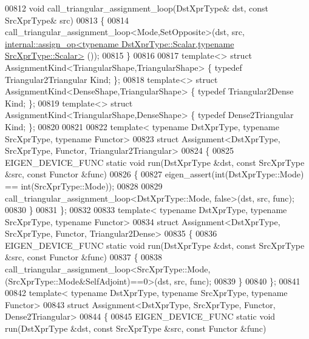 \begin{DoxyCode}
00812 \textcolor{keywordtype}{void} call\_triangular\_assignment\_loop(DstXprType& dst, \textcolor{keyword}{const} SrcXprType& src)
00813 \{
00814   call\_triangular\_assignment\_loop<Mode,SetOpposite>(dst, src, 
      \hyperlink{struct_eigen_1_1internal_1_1assign__op}{internal::assign\_op<typename DstXprType::Scalar,typename SrcXprType::Scalar>}
      ());
00815 \}
00816 
00817 \textcolor{keyword}{template}<> \textcolor{keyword}{struct }AssignmentKind<TriangularShape,TriangularShape> \{ \textcolor{keyword}{typedef} Triangular2Triangular Kind; \};
00818 \textcolor{keyword}{template}<> \textcolor{keyword}{struct }AssignmentKind<DenseShape,TriangularShape>      \{ \textcolor{keyword}{typedef} Triangular2Dense      Kind; \};
00819 \textcolor{keyword}{template}<> \textcolor{keyword}{struct }AssignmentKind<TriangularShape,DenseShape>      \{ \textcolor{keyword}{typedef} Dense2Triangular      Kind; \};
00820 
00821 
00822 \textcolor{keyword}{template}< \textcolor{keyword}{typename} DstXprType, \textcolor{keyword}{typename} SrcXprType, \textcolor{keyword}{typename} Functor>
00823 \textcolor{keyword}{struct }Assignment<DstXprType, SrcXprType, Functor, Triangular2Triangular>
00824 \{
00825   EIGEN\_DEVICE\_FUNC \textcolor{keyword}{static} \textcolor{keywordtype}{void} run(DstXprType &dst, \textcolor{keyword}{const} SrcXprType &src, \textcolor{keyword}{const} Functor &func)
00826   \{
00827     eigen\_assert(\textcolor{keywordtype}{int}(DstXprType::Mode) == \textcolor{keywordtype}{int}(SrcXprType::Mode));
00828     
00829     call\_triangular\_assignment\_loop<DstXprType::Mode, false>(dst, src, func);  
00830   \}
00831 \};
00832 
00833 \textcolor{keyword}{template}< \textcolor{keyword}{typename} DstXprType, \textcolor{keyword}{typename} SrcXprType, \textcolor{keyword}{typename} Functor>
00834 \textcolor{keyword}{struct }Assignment<DstXprType, SrcXprType, Functor, Triangular2Dense>
00835 \{
00836   EIGEN\_DEVICE\_FUNC \textcolor{keyword}{static} \textcolor{keywordtype}{void} run(DstXprType &dst, \textcolor{keyword}{const} SrcXprType &src, \textcolor{keyword}{const} Functor &func)
00837   \{
00838     call\_triangular\_assignment\_loop<SrcXprType::Mode, (SrcXprType::Mode&SelfAdjoint)==0>(dst, src, func);  
00839   \}
00840 \};
00841 
00842 \textcolor{keyword}{template}< \textcolor{keyword}{typename} DstXprType, \textcolor{keyword}{typename} SrcXprType, \textcolor{keyword}{typename} Functor>
00843 \textcolor{keyword}{struct }Assignment<DstXprType, SrcXprType, Functor, Dense2Triangular>
00844 \{
00845   EIGEN\_DEVICE\_FUNC \textcolor{keyword}{static} \textcolor{keywordtype}{void} run(DstXprType &dst, \textcolor{keyword}{const} SrcXprType &src, \textcolor{keyword}{const} Functor &func)

\end{DoxyCode}
